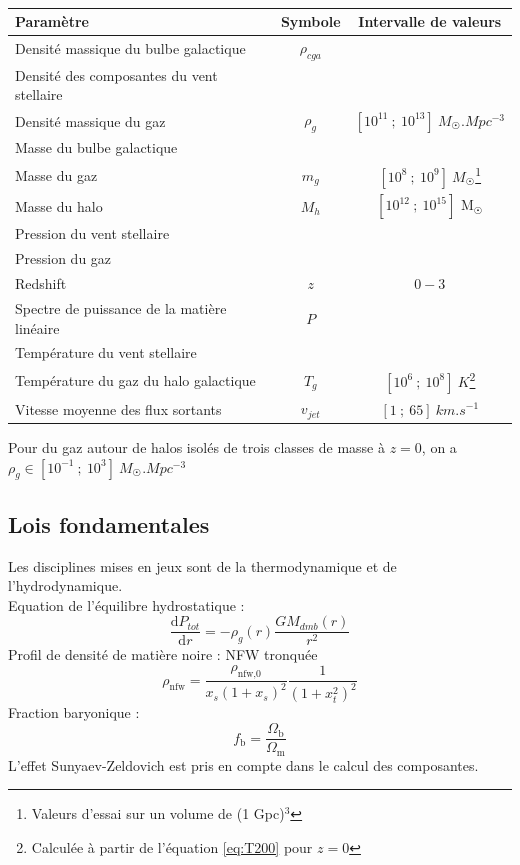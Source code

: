 \documentclass[a4paper, french, 11 pt]{article}
\newcommand{\deriv}{\mathrm{d}}
\begin{document}
\begin{table}[h]
\centering
\begin{tabular}{|l c c|}
    \hline
    Paramètre & Symbole & Intervalle de valeurs \\
    \hline
    Densité massique du bulbe galactique & $\rho_{cga}$ & \\
    Densité des composantes du vent stellaire & & \\
    Densité massique du gaz & $\rho_g$ & $[10^{11}\ ;\ 10^{13}]\ \unit{M_{\Sun}.Mpc^{-3}}$ \cite{schneider2025baryonificationalternativehydrodynamicalsimulations} \\
    Masse du bulbe galactique & & \\
    Masse du gaz & $m_g$ & $[10^{8}\ ;\ 10^{9}]\ \unit{M_{\Sun}}$\footnote{Valeurs d'essai sur un volume de (1 Gpc)$^3$} \cite{kovac2025baryonificationiiconstrainingfeedback}\\
    Masse du halo & $M_h$ & $[10^{12}\ ;\ 10^{15}]$ M$_{\Sun}$\\
    Pression du vent stellaire & & \\
    Pression du gaz & & \\
    Redshift & $z$ & $0-3$ \\
    Spectre de puissance de la matière linéaire & $P$ & \\
    Température du vent stellaire & & \\
    Température du gaz du halo galactique & $T_g$ & $[10^{6}\ ;\ 10^8]\ \unit{K}$\footnote{Calculée à partir de l'équation \ref{eq:T200} pour $z=0$}\\
    Vitesse moyenne des flux sortants & $v_{jet}$ & $[1\ ;\ 65]\ \unit{km.s^{-1}}$ \cite{Ondaro_Mallea_2025}\\
    \hline
\end{tabular} 
\caption{}
\end{table}
Pour du gaz autour de halos isolés de trois classes de masse à $z = 0$, on a 
$\rho_g\in [10^{-1}\ ;\ 10^{3}]\ \unit{M_{\Sun}.Mpc^{-3}}$ \cite{Ondaro_Mallea_2025}
\subsection{Lois fondamentales}
Les disciplines mises en jeux sont de la thermodynamique et de l'hydrodynamique.\\
Equation de l'équilibre hydrostatique :
\begin{equation}
\frac{\deriv P_{tot}}{\deriv r}=-\rho_g(r)\frac{GM_{dmb}(r)}{r^2}
\end{equation} 
Profil de densité de matière noire : NFW tronquée\\
\begin{equation}
\rho_{\text{nfw}}=\frac{\rho_{\text{nfw,0}}}{x_s(1+x_s)^2}\frac{1}{(1+x_t^2)^2}
\end{equation}
Fraction baryonique :
\begin{equation}
f_\text{b}=\frac{\Omega_\text{b}}{\Omega_\text{m}}
\end{equation}
L'effet Sunyaev-Zeldovich est pris en compte dans le calcul des composantes.\\
\end{document}
